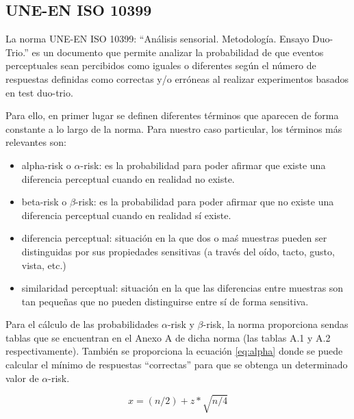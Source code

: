 \documentclass[11pt,a4paper]{book}
\begin{document}
        \subsection*{UNE-EN ISO 10399}
            La norma UNE-EN ISO 10399: ``Análisis sensorial. Metodología. Ensayo Duo-Trio.''\cite{ISO10399} es un documento que permite analizar la probabilidad de que eventos perceptuales sean percibidos como iguales o diferentes según el número de respuestas definidas como correctas y/o erróneas al realizar experimentos basados en test duo-trio.
        
            Para ello, en primer lugar se definen diferentes términos que aparecen de forma constante a lo largo de la norma. Para nuestro caso particular, los términos más relevantes son:
        
            \begin{itemize}
                \item alpha-risk o $\alpha$-risk: es la probabilidad para poder afirmar que existe una diferencia perceptual cuando en realidad no existe.
                \item beta-risk o $\beta$-risk: es la probabilidad para poder afirmar que no existe una diferencia perceptual cuando en realidad sí existe.
                \item diferencia perceptual: situación en la que dos o maś muestras pueden ser distinguidas por sus propiedades sensitivas (a través del oído, tacto, gusto, vista, etc.)
                \item similaridad perceptual: situación en la que las diferencias entre muestras son tan pequeñas que no pueden distinguirse entre sí de forma sensitiva.
            \end{itemize}
            Para el cálculo de las probabilidades $\alpha$-risk y $\beta$-risk, la norma proporciona sendas tablas que se encuentran en el Anexo A de dicha norma (las tablas A.1 y A.2 respectivamente). También se proporciona la ecuación \ref{eq:alpha} donde se puede calcular el mínimo de respuestas ``correctas'' para que se obtenga un determinado valor de $\alpha$-risk.
            
            \begin{equation}
                x=(n/2)+z*\sqrt{n/4}
                \label{eq:alpha}
            \end{equation}
            
\end{document}
